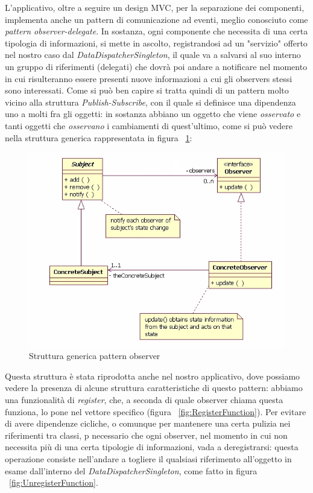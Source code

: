 L'applicativo, oltre a seguire un design MVC, per la separazione dei componenti, implementa anche un pattern di comunicazione ad eventi, meglio conosciuto come \textit{pattern observer-delegate}. 
In sostanza, ogni componente che necessita di una certa tipologia di informazioni, si mette in ascolto, registrandosi ad un "servizio" offerto nel nostro caso dal \textit{DataDispatcherSingleton}, il quale va a salvarsi al suo interno un gruppo di riferimenti (delegati) che dovrà poi andare a notificare nel momento in cui risulteranno essere presenti nuove informazioni a cui gli observers stessi sono interessati.
Come si può ben capire si tratta quindi di un pattern molto vicino alla struttura \textit{Publish-Subscribe}, con il quale si definisce una dipendenza uno a molti fra gli oggetti: in sostanza abbiano un oggetto che viene \textit{osservato} e tanti oggetti che \textit{osservano} i cambiamenti di quest'ultimo, come si può vedere nella struttura generica rappresentata in figura ~\ref{fig:ObserverStructure}:

\begin{figure}[h]
	\includegraphics[width=\textwidth]{Immagini/Observer/ObserverTheory.jpg}
	\caption{Struttura generica pattern observer}
	\label{fig:ObserverStructure}
\end{figure}

Questa struttura è stata riprodotta anche nel nostro applicativo, dove possiamo vedere la presenza di alcune struttura caratteristiche di questo pattern: abbiamo una funzionalità di \textit{register}, che, a seconda di quale observer chiama questa funziona, lo pone nel vettore specifico (figura ~\ref{fig:RegisterFunction}). Per evitare di avere dipendenze cicliche, o comunque per mantenere una certa pulizia nei riferimenti tra classi, p necessario che ogni observer, nel momento in cui non necessita più di una certa tipologie di informazioni, vada a deregistrarsi: questa operazione consiste nell'andare a togliere il qualsiasi riferimento all'oggetto in esame dall'interno del \textit{DataDispatcherSingleton}, come fatto in figura ~\ref{fig:UnregisterFunction}.

